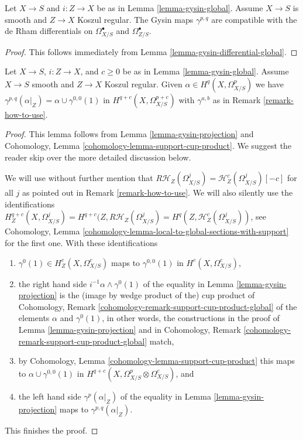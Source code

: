 \begin{lemma}
\label{lemma-gysin-differential-hodge}
Let $X \to S$ and $i : Z \to X$ be as in Lemma \ref{lemma-gysin-global}.
Assume $X \to S$ is smooth and $Z \to X$ Koszul regular.
The Gysin maps $\gamma^{p, q}$ are compatible with the de Rham
differentials on $\Omega^\bullet_{X/S}$ and $\Omega^\bullet_{Z/S}$.
\end{lemma}

\begin{proof}
This follows immediately from
Lemma \ref{lemma-gysin-differential-global}.
\end{proof}

\begin{lemma}
\label{lemma-gysin-projection-global}
Let $X \to S$, $i : Z \to X$, and $c \geq 0$ be as in
Lemma \ref{lemma-gysin-global}. Assume $X \to S$ smooth and
$Z \to X$ Koszul regular. Given $\alpha \in H^q(X, \Omega^p_{X/S})$ we have
$\gamma^{p, q}(\alpha|_Z) = \alpha \cup \gamma^{0, 0}(1)$ in
$H^{q + c}(X, \Omega^{p + c}_{X/S})$ with $\gamma^{a, b}$ as in
Remark \ref{remark-how-to-use}.
\end{lemma}

\begin{proof}
This lemma follows from Lemma \ref{lemma-gysin-projection}
and Cohomology, Lemma \ref{cohomology-lemma-support-cup-product}.
We suggest the reader skip over the more detailed discussion below.

\medskip\noindent
We will use without further mention that
$R\mathcal{H}_Z(\Omega^j_{X/S}) = \mathcal{H}^c_Z(\Omega^j_{X/S})[-c]$
for all $j$ as pointed out in Remark \ref{remark-how-to-use}.
We will also silently use the identifications
$H^{q + c}_Z(X, \Omega^j_{X/S}) = H^{q + c}(Z, R\mathcal{H}_Z(\Omega^j_{X/S}) =
H^q(Z, \mathcal{H}^c_Z(\Omega^j_{X/S}))$, see
Cohomology, Lemma \ref{cohomology-lemma-local-to-global-sections-with-support}
for the first one. With these identifications
\begin{enumerate}
\item $\gamma^0(1) \in H^c_Z(X, \Omega^c_{X/S})$ maps to $\gamma^{0, 0}(1)$
in $H^c(X, \Omega^c_{X/S})$,
\item the right hand side $i^{-1}\alpha \wedge \gamma^0(1)$
of the equality in Lemma \ref{lemma-gysin-projection}
is the (image by wedge product of the) cup product of
Cohomology, Remark \ref{cohomology-remark-support-cup-product-global} 
of the elements $\alpha$ and $\gamma^0(1)$, in other words, the constructions
in the proof of Lemma \ref{lemma-gysin-projection} and in
Cohomology, Remark \ref{cohomology-remark-support-cup-product-global} match,
\item by Cohomology, Lemma \ref{cohomology-lemma-support-cup-product}
this maps to $\alpha \cup \gamma^{0, 0}(1)$ in
$H^{q + c}(X, \Omega^p_{X/S} \otimes \Omega^c_{X/S})$, and
\item the left hand side $\gamma^p(\alpha|_Z)$ of the equality in
Lemma \ref{lemma-gysin-projection} maps to
$\gamma^{p, q}(\alpha|_Z)$.
\end{enumerate}
This finishes the proof.
\end{proof}

